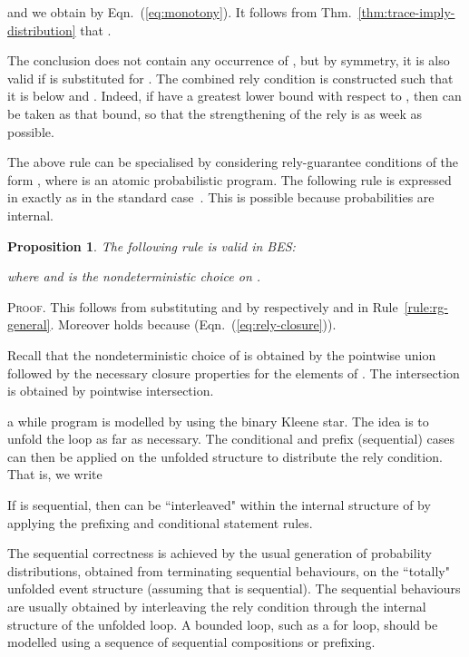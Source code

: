 \documentclass[review]{elsart}
\newtheorem{proposition}[definition]{Proposition}
\newenvironment{proof}{\par
\noindent
\textsc{Proof. }
\noindent}{\hfill}
\newcommand{\Eqn}[1]{Eqn.~(\ref{#1})}
\newcommand{\Thm}[1]{Thm.~\ref{#1}}
\begin{document}
and we obtain  by \Eqn{eq:monotony}. It follows from \Thm{thm:trace-imply-distribution} that . 

The conclusion does not contain any occurrence of , but by symmetry, it is also valid if  is substituted for . The combined rely condition  is constructed such that it is below  and . Indeed, if  have a greatest lower bound with respect to , then  can be taken as that bound, so that the strengthening of the rely is as week as possible. 

The above rule can be specialised by considering rely-guarantee conditions of the form , where  is an atomic probabilistic program. The following rule is expressed in exactly as in the standard case~\cite{Hoa11}. This is possible because probabilities are internal.

\begin{proposition}\label{pro:rule1}
The following rule is valid in BES:

where  and  is the nondeterministic choice on .
\end{proposition}

\begin{proof}
This follows from substituting  and  by respectively  and  in Rule~\ref{rule:rg-general}. Moreover  holds because  (\Eqn{eq:rely-closure}).
\end{proof}

Recall that the nondeterministic choice of  is obtained by the pointwise union followed by the necessary closure properties for the elements of . The intersection  is obtained by pointwise intersection.

a while program is modelled by using the binary Kleene star. The idea is to unfold the loop as far as necessary. The conditional and prefix (sequential) cases can then be applied on the unfolded structure to distribute the rely condition. That is, we write 

If  is sequential, then  can be ``interleaved" within the internal structure of  by applying the prefixing and conditional statement rules.

The sequential correctness is achieved by the usual generation of probability distributions, obtained from terminating sequential behaviours, on the ``totally" unfolded event structure (assuming that  is sequential). The sequential behaviours are usually obtained by interleaving the rely condition  through the internal structure of the unfolded loop. A bounded loop, such as a for loop, should be modelled using a sequence of sequential compositions or prefixing.
\end{document}
